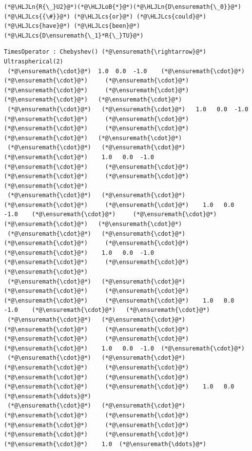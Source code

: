 \documentclass[12pt,a4paper]{article}
\newcommand{\HLJLn}[1]{#1}
\newcommand{\HLJLoB}[1]{\textcolor[RGB]{102,102,102}{\textbf{#1}}}
\newcommand{\HLJLcs}[1]{\textcolor[RGB]{153,153,119}{\textit{#1}}}
\begin{document}
\begin{lstlisting}
(*@\HLJLn{R{\_}U2}@*)(*@\HLJLoB{*}@*)(*@\HLJLn{D\ensuremath{\_0}}@*)  (*@\HLJLcs{{\#}}@*) (*@\HLJLcs{or}@*) (*@\HLJLcs{could}@*) (*@\HLJLcs{have}@*) (*@\HLJLcs{been}@*) (*@\HLJLcs{D\ensuremath{\_1}*R{\_}TU}@*)
\end{lstlisting}

\begin{lstlisting}
TimesOperator : Chebyshev() (*@\ensuremath{\rightarrow}@*) Ultraspherical(2)
 (*@\ensuremath{\cdot}@*)  1.0  0.0  -1.0    (*@\ensuremath{\cdot}@*)     (*@\ensuremath{\cdot}@*)     (*@\ensuremath{\cdot}@*)     (*@\ensuremath{\cdot}@*)     (*@\ensuremath{\cdot}@*)     (*@\ensuremath{\cdot}@*)   (*@\ensuremath{\cdot}@*)
 (*@\ensuremath{\cdot}@*)   (*@\ensuremath{\cdot}@*)   1.0   0.0  -1.0    (*@\ensuremath{\cdot}@*)     (*@\ensuremath{\cdot}@*)     (*@\ensuremath{\cdot}@*)     (*@\ensuremath{\cdot}@*)     (*@\ensuremath{\cdot}@*)   (*@\ensuremath{\cdot}@*)
 (*@\ensuremath{\cdot}@*)   (*@\ensuremath{\cdot}@*)    (*@\ensuremath{\cdot}@*)    1.0   0.0  -1.0    (*@\ensuremath{\cdot}@*)     (*@\ensuremath{\cdot}@*)     (*@\ensuremath{\cdot}@*)     (*@\ensuremath{\cdot}@*)   (*@\ensuremath{\cdot}@*)
 (*@\ensuremath{\cdot}@*)   (*@\ensuremath{\cdot}@*)    (*@\ensuremath{\cdot}@*)     (*@\ensuremath{\cdot}@*)    1.0   0.0  -1.0    (*@\ensuremath{\cdot}@*)     (*@\ensuremath{\cdot}@*)     (*@\ensuremath{\cdot}@*)   (*@\ensuremath{\cdot}@*)
 (*@\ensuremath{\cdot}@*)   (*@\ensuremath{\cdot}@*)    (*@\ensuremath{\cdot}@*)     (*@\ensuremath{\cdot}@*)     (*@\ensuremath{\cdot}@*)    1.0   0.0  -1.0    (*@\ensuremath{\cdot}@*)     (*@\ensuremath{\cdot}@*)   (*@\ensuremath{\cdot}@*)
 (*@\ensuremath{\cdot}@*)   (*@\ensuremath{\cdot}@*)    (*@\ensuremath{\cdot}@*)     (*@\ensuremath{\cdot}@*)     (*@\ensuremath{\cdot}@*)     (*@\ensuremath{\cdot}@*)    1.0   0.0  -1.0    (*@\ensuremath{\cdot}@*)   (*@\ensuremath{\cdot}@*)
 (*@\ensuremath{\cdot}@*)   (*@\ensuremath{\cdot}@*)    (*@\ensuremath{\cdot}@*)     (*@\ensuremath{\cdot}@*)     (*@\ensuremath{\cdot}@*)     (*@\ensuremath{\cdot}@*)     (*@\ensuremath{\cdot}@*)    1.0   0.0  -1.0  (*@\ensuremath{\cdot}@*)
 (*@\ensuremath{\cdot}@*)   (*@\ensuremath{\cdot}@*)    (*@\ensuremath{\cdot}@*)     (*@\ensuremath{\cdot}@*)     (*@\ensuremath{\cdot}@*)     (*@\ensuremath{\cdot}@*)     (*@\ensuremath{\cdot}@*)     (*@\ensuremath{\cdot}@*)    1.0   0.0  (*@\ensuremath{\ddots}@*)
 (*@\ensuremath{\cdot}@*)   (*@\ensuremath{\cdot}@*)    (*@\ensuremath{\cdot}@*)     (*@\ensuremath{\cdot}@*)     (*@\ensuremath{\cdot}@*)     (*@\ensuremath{\cdot}@*)     (*@\ensuremath{\cdot}@*)     (*@\ensuremath{\cdot}@*)     (*@\ensuremath{\cdot}@*)    1.0  (*@\ensuremath{\ddots}@*)

\end{lstlisting}
\end{document}
